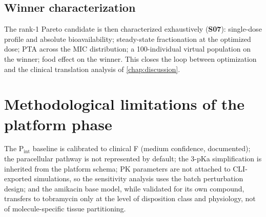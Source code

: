 \subsection{Winner characterization}
The rank-1 Pareto candidate is then characterized exhaustively (\textbf{S07}): single-dose profile and absolute bioavailability; steady-state fractionation at the optimized dose; PTA across the MIC distribution; a 100-individual virtual population on the winner; food effect on the winner. This closes the loop between optimization and the clinical translation analysis of \cref{chap:discussion}.

\section{Methodological limitations of the platform phase}
The P$_{\mathrm{int}}$ baseline is calibrated to clinical F (medium confidence, documented); the paracellular pathway is not represented by default; the 3-pKa simplification is inherited from the platform schema; PK parameters are not attached to CLI-exported simulations, so the sensitivity analysis uses the batch perturbation design; and the amikacin base model, while validated for its own compound, transfers to tobramycin only at the level of disposition class and physiology, not of molecule-specific tissue partitioning.
